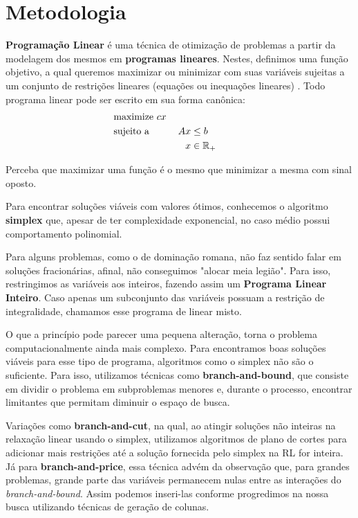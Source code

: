 \documentclass[11pt]{article}
\begin{document}
{\section{Metodologia}
\label{sec:org47c74bb}

\textbf{Programação Linear} é uma técnica de otimização de problemas a partir da modelagem dos mesmos em \textbf{programas lineares}.
Nestes, definimos uma função objetivo, a qual queremos maximizar ou minimizar com suas variáveis sujeitas a um conjunto de restrições lineares (equações ou inequações lineares) \autocite{Chvatal1983LinearProgramming} . Todo programa linear pode ser escrito em sua forma canônica:
\begin{alignat*}{4}
& \omit\rlap{maximize  $\displaystyle cx$} \\
& \mbox{sujeito a}&& \quad & Ax & \leq b  & \quad &  \\
&                 &&       & x               & \in \mathbb{R}_+ &      &
\end{alignat*}

Perceba que maximizar uma função é o mesmo que minimizar a mesma com sinal oposto.

Para encontrar soluções viáveis com valores ótimos, conhecemos o algoritmo \textbf{simplex} que, apesar de ter complexidade exponencial, no caso médio possui comportamento polinomial.

Para alguns problemas, como o de dominação romana, não faz sentido falar em soluções fracionárias, afinal, não conseguimos "alocar meia legião".
Para isso, restringimos as variáveis aos inteiros, fazendo assim um \textbf{Programa Linear Inteiro}. Caso apenas um subconjunto das variáveis possuam a restrição de integralidade, chamamos esse programa de linear misto.


O que a princípio pode parecer uma pequena alteração, torna o problema computacionalmente ainda mais complexo. Para encontramos boas soluções viáveis para esse tipo de programa, algoritmos como o simplex não são o suficiente. Para isso, utilizamos técnicas como \textbf{branch-and-bound}, que consiste em dividir o problema em subproblemas menores e, durante o processo, encontrar limitantes que permitam diminuir o espaço de busca.

Variações como \textbf{branch-and-cut}, na qual, ao atingir soluções não inteiras na relaxação linear usando o simplex, utilizamos algoritmos de plano de cortes para adicionar mais restrições até a solução fornecida pelo simplex na RL for inteira.
Já para \textbf{branch-and-price}, essa técnica advém da observação que, para grandes problemas, grande parte das variáveis permanecem nulas entre as interações do \emph{branch-and-bound}.
Assim podemos inseri-las conforme progredimos na nossa busca utilizando técnicas de geração de colunas.

}
\end{document}

